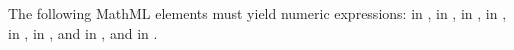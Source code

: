 The following MathML elements must yield numeric expressions: 
in \KineticLaw,  in \SpeciesReference,
 in \InitialAssignment,  in \AssignmentRule,
 in \RateRule,  in \AlgebraicRule, 
and  in \Event, and  in \EventAssignment.


